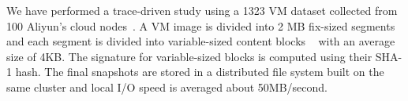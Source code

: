 
We have performed a trace-driven study using  a 1323 VM dataset  collected from 100 Aliyun's cloud nodes~\cite{WeiZhangIEEE}.
%
A VM image is  divided into 2 MB fix-sized segments and each segment is divided into 
variable-sized content blocks ~\cite{similar94,rabin81} with an average size of 4KB.
The signature for variable-sized blocks is computed using their SHA-1 hash. 
The final snapshots are stored in a distributed file system built on the same cluster and local I/O speed is averaged
about 50MB/second. 




